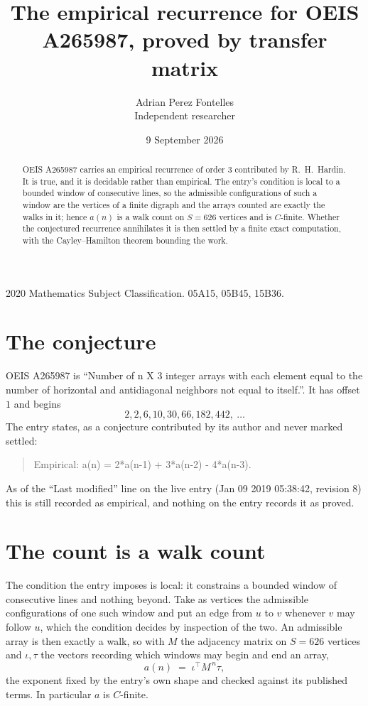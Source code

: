 \documentclass[11pt,a4paper]{article}
\title{The empirical recurrence for OEIS A265987, proved by transfer matrix}
\author{Adrian Perez Fontelles\\ \small Independent researcher}
\date{9 September 2026}
\theoremstyle{plain}
\theoremstyle{definition}
\begin{document}
\maketitle

\begin{abstract}
OEIS A265987 carries an empirical recurrence of order $3$ contributed by R.~H.~Hardin. It is
true, and it is decidable rather than empirical. The entry's condition is local to a bounded window of consecutive lines, so
the admissible configurations of such a window are the vertices of a finite digraph and the
arrays counted are exactly the walks in it; hence $a(n)$ is a walk count on $S=626$ vertices
and is $C$-finite. Whether the conjectured recurrence annihilates it is then settled by a
finite exact computation, with the Cayley--Hamilton theorem bounding the work.
\end{abstract}

\noindent\small 2020 Mathematics Subject Classification. 05A15, 05B45, 15B36.\normalsize

\section{The conjecture}

OEIS A265987 is ``Number of n X 3 integer arrays with each element equal to the number of horizontal and antidiagonal neighbors not equal to itself.''. It has offset $1$ and begins
\[
2, 2, 6, 10, 30, 66, 182, 442,\ \dots
\]
The entry states, as a conjecture contributed by its author and never marked settled:
\begin{quote}
Empirical: a(n) = 2*a(n-1) + 3*a(n-2) - 4*a(n-3).
\end{quote}
As of the ``Last modified'' line on the live entry (Jan 09 2019 05:38:42, revision 8) this is still
recorded as empirical, and nothing on the entry records it as proved.

\section{The count is a walk count}

The condition the entry imposes is local: it constrains a bounded window of consecutive lines and nothing beyond. Take as
vertices the admissible configurations of one such window and put an edge from $u$ to $v$
whenever $v$ may follow $u$, which the condition decides by inspection of the two. An
admissible array is then exactly a walk, so with $M$ the adjacency matrix on $S=626$ vertices
and $\iota,\tau$ the vectors recording which windows may begin and end an array,
\[
a(n)\;=\;\iota^{\!\top}M^{\,n}\tau ,
\]
the exponent fixed by the entry's own shape and checked against its published terms. In
particular $a$ is $C$-finite.
\end{document}
